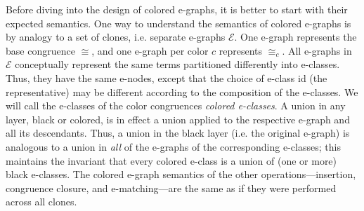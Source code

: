 Before diving into the design of colored e-graphs, it is better to start with their expected semantics.
One way to understand the semantics of colored e-graphs is by analogy to a set of clones, i.e. separate e-graphs $\mathcal{E}$.
One e-graph represents the base congruence $\cong$,
and one e-graph per color $c$ represents $\cong_c$.
All e-graphs in $\mathcal{E}$ conceptually represent the same terms partitioned differently into e-classes.
Thus, they have the same e-nodes, except that the choice of e-class id (the representative) may be different according to the composition of the e-classes.
We will call the e-classes of the color congruences \emph{colored e-classes}.
A union in any layer, black or colored, is in effect a union applied to the respective e-graph and all its descendants. 
Thus, a union in the black layer (i.e. the original e-graph) is analogous to a union in \emph{all} of the e-graphs of the corresponding e-classes;
this maintains the invariant that every colored e-class is a union of (one or more) black e-classes.
The colored e-graph semantics of the other operations---insertion, congruence closure, and e-matching---are the same as if they were performed across all clones.

